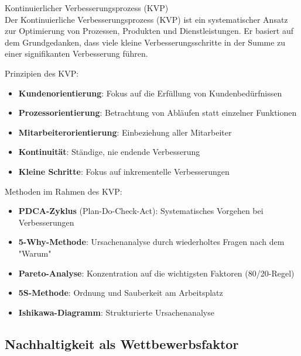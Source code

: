\begin{concept}{Kontinuierlicher Verbesserungsprozess (KVP)}\\
Der Kontinuierliche Verbesserungsprozess (KVP) ist ein systematischer Ansatz zur Optimierung von Prozessen, Produkten und Dienstleistungen. Er basiert auf dem Grundgedanken, dass viele kleine Verbesserungsschritte in der Summe zu einer signifikanten Verbesserung führen.

Prinzipien des KVP:
\begin{itemize}
    \item \textbf{Kundenorientierung}: Fokus auf die Erfüllung von Kundenbedürfnissen
    \item \textbf{Prozessorientierung}: Betrachtung von Abläufen statt einzelner Funktionen
    \item \textbf{Mitarbeiterorientierung}: Einbeziehung aller Mitarbeiter
    \item \textbf{Kontinuität}: Ständige, nie endende Verbesserung
    \item \textbf{Kleine Schritte}: Fokus auf inkrementelle Verbesserungen
\end{itemize}

Methoden im Rahmen des KVP:
\begin{itemize}
    \item \textbf{PDCA-Zyklus} (Plan-Do-Check-Act): Systematisches Vorgehen bei Verbesserungen
    \item \textbf{5-Why-Methode}: Ursachenanalyse durch wiederholtes Fragen nach dem "Warum"
    \item \textbf{Pareto-Analyse}: Konzentration auf die wichtigsten Faktoren (80/20-Regel)
    \item \textbf{5S-Methode}: Ordnung und Sauberkeit am Arbeitsplatz
    \item \textbf{Ishikawa-Diagramm}: Strukturierte Ursachenanalyse
\end{itemize}
\end{concept}

\subsection{Nachhaltigkeit als Wettbewerbsfaktor}

